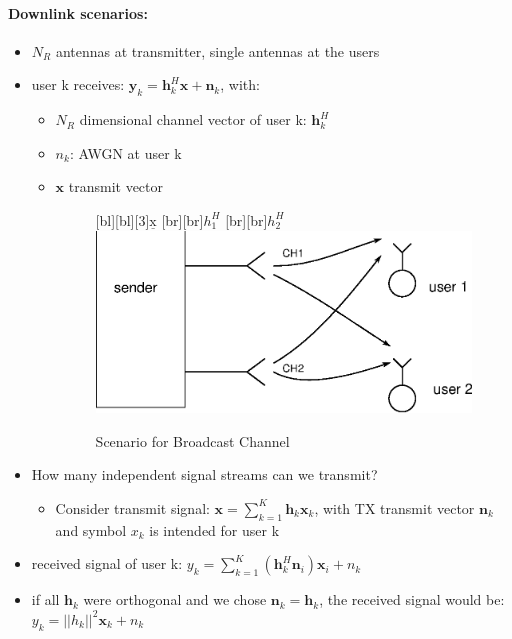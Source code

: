 \documentclass[a4paper, 10pt]{article}
\begin{document}
\paragraph{Downlink scenarios:}
\begin{itemize}
	\item $N_R $ antennas at transmitter, single antennas at the users
	\item user k receives: $ \mathbf{y}_k = \mathbf{h}_k^H\mathbf{x} + \mathbf{n}_k $, with:
	\begin{itemize}
		\item $N_R $ dimensional channel vector of user k: $\mathbf{h}_k^H $
		\item $n_k$: AWGN at user k
		\item $\mathbf{x} $ transmit vector  
	\begin{figure}[ht]
		\centering
		[bl][bl][3]{$\underline{\text{x}}$}
		[br][br]{$h_1^H$}
		[br][br]{$h_2^H$}
		\includegraphics[scale=0.8]{BroadcastChannel_scenario}
		\caption{Scenario for Broadcast Channel}
		\label{fig:BroadcastChannel_scenario}
	\end{figure}
	\end{itemize}
	\item How many independent signal streams can we transmit?
	\begin{itemize}
		\item Consider transmit signal: $\mathbf{x} = \sum\limits_{k = 1}^{K}\mathbf{h}_k\mathbf{x}_k $, with TX transmit vector $\mathbf{n}_k $ and symbol $x_k $ is intended for user k
	\end{itemize}
	\item received signal of user k: $y_k = \sum\limits_{k = 1}^{K}(\mathbf{h}_k^H\mathbf{n}_i)\mathbf{x}_i + n_k $
	\item if all $\mathbf{h}_k $ were orthogonal and we chose $\mathbf{n}_k = \mathbf{h}_k $, the received signal would be: \\ $y_k = ||h_k||^2\mathbf{x}_k + n_k $

\end{itemize}
\end{document}
